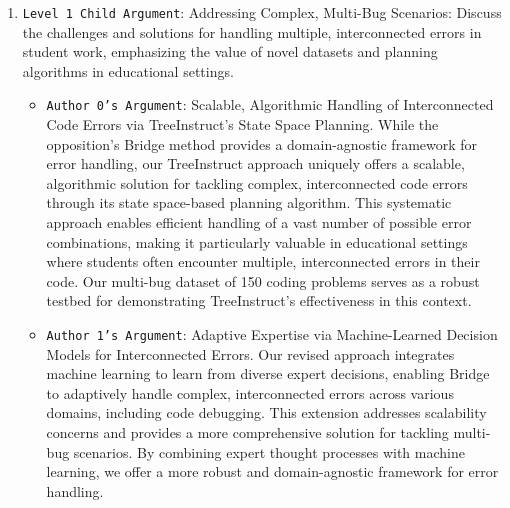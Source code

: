 \begin{enumerate}
    \item \texttt{Level 1 Child Argument}: Addressing Complex, Multi-Bug Scenarios: Discuss the challenges and solutions for handling multiple, interconnected errors in student work, emphasizing the value of novel datasets and planning algorithms in educational settings.
    \begin{itemize}
        \item \texttt{Author 0's Argument}:  Scalable, Algorithmic Handling of Interconnected Code Errors via TreeInstruct's State Space Planning. While the opposition's Bridge method provides a domain-agnostic framework for error handling, our TreeInstruct approach uniquely offers a scalable, algorithmic solution for tackling complex, interconnected code errors through its state space-based planning algorithm. This systematic approach enables efficient handling of a vast number of possible error combinations, making it particularly valuable in educational settings where students often encounter multiple, interconnected errors in their code. Our multi-bug dataset of 150 coding problems serves as a robust testbed for demonstrating TreeInstruct's effectiveness in this context.
	\item \texttt{Author 1's Argument}:  Adaptive Expertise via Machine-Learned Decision Models for Interconnected Errors. Our revised approach integrates machine learning to learn from diverse expert decisions, enabling Bridge to adaptively handle complex, interconnected errors across various domains, including code debugging. This extension addresses scalability concerns and provides a more comprehensive solution for tackling multi-bug scenarios. By combining expert thought processes with machine learning, we offer a more robust and domain-agnostic framework for error handling.
    \end{itemize}


\end{enumerate}
